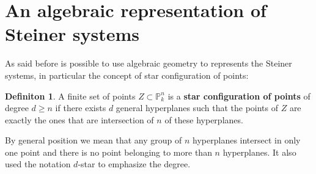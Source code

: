 \documentclass[notitlepage, a4]{book}
\theoremstyle{plain}
\theoremstyle{remark}
\theoremstyle{definition}
\newtheorem{deff}[teo]{Definiton}
\newcommand{\PP}{\mathbb{P}}
\begin{document}
\section[Ideal of Steiner configuration]{An algebraic representation of Steiner systems}

As said before is possible to use algebraic geometry to represents the Steiner systems, in particular the concept of star configuration of points:

\begin{deff} \label{def:starconf}
A finite set of points $ Z \subset \PP_k^n $ is a \textbf{star configuration of points} of degree $ d \geq n $ if there exists $ d $ general hyperplanes such that the points of $ Z $ are exactly the ones that are intersection of $ n $ of these hyperplanes.
\end{deff}
By general position we mean that any group of $ n $ hyperplanes intersect in only one point and there is no point belonging to more than $ n $ hyperplanes. It also used the notation $ d $-star to emphasize the degree. 
\end{document}
